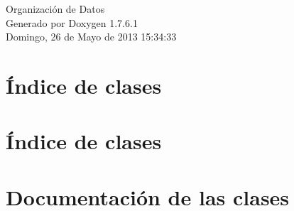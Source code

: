 \documentclass[a4paper]{book}
\begin{document}
\hypersetup{pageanchor=false,citecolor=blue}
\begin{titlepage}
\vspace*{7cm}
\begin{center}
{\Large \-Organización de \-Datos }\\
\vspace*{1cm}
{\large \-Generado por Doxygen 1.7.6.1}\\
\vspace*{0.5cm}
{\small Domingo, 26 de Mayo de 2013 15:34:33}\\
\end{center}
\end{titlepage}
\clearemptydoublepage
{}
\tableofcontents
\clearemptydoublepage
{}
\hypersetup{pageanchor=true,citecolor=blue}
\chapter{Índice de clases}

\chapter{Índice de clases}

\chapter{\-Documentación de las clases}











































\printindex
\end{document}
